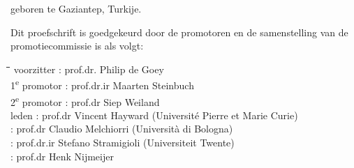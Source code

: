 {\begin{center}
\vspace{15mm}

geboren te Gaziantep, Turkije.
\end{center}

\newpage %
\thispagestyle{empty}
\noindent Dit proefschrift is goedgekeurd door de promotoren en de samenstelling van de 
promotiecommissie is als volgt:
\bigskip{}
\noindent
\begin{flushleft}
\begin{tabbing}
\hspace*{20mm}\=\hspace{1em}\=\hspace{15mm}\=\hspace{35mm}\=\kill
voorzitter                     \> : \> prof.dr.   \> Philip de Goey                                           \\
1\textsuperscript{e} promotor  \> : \> prof.dr.ir \> Maarten Steinbuch                                        \\
2\textsuperscript{e} promotor  \> : \> prof.dr	  \>  Siep Weiland                                            \\
leden                          \> : \> prof.dr    \> Vincent Hayward    \> (Université Pierre et Marie Curie) \\
                               \> : \> prof.dr    \> Claudio Melchiorri \> (Università di Bologna)            \\
                               \> : \> prof.dr.ir \> Stefano Stramigioli\> (Universiteit Twente)              \\
                               \> : \> prof.dr    \> Henk Nijmeijer                                           \\
\end{tabbing}
\end{flushleft}
}
\newpage
\thispagestyle{empty}
\begin{center}
    \textbf{\huge \ilhant}
\end{center}

